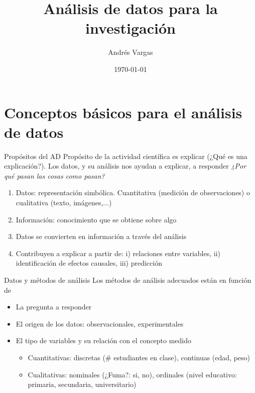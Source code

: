 \documentclass{beamer}
\title{Análisis de datos para la investigación}
\date {\today}
\author {Andrés Vargas}
\institute {Universidad del Norte \\ Departamento de Economía}
\begin{document}
	\maketitle
\section{Conceptos básicos para el análisis de datos}

\begin{frame}{Propósitos del AD}
Propósito de la actividad científica es explicar (¿Qué es una explicación?). Los datos, y su análisis nos ayudan a explicar, a responder \textit{¿Por qué pasan las cosas como pasan?}
\begin{enumerate}
    \item Datos: representación simbólica. Cuantitativa (medición de observaciones) o cualitativa (texto, imágenes,...)
    \item Información: conocimiento que se obtiene sobre algo
    \item Datos se convierten en información a través del análisis
    \item Contribuyen a explicar a partir de: i) relaciones entre variables, ii) identificación de efectos causales, iii) predicción
\end{enumerate}
    
\end{frame}

\begin{frame}{Datos y métodos de análisis}
Los métodos de análisis adecuados están en función de
\begin{itemize}
    \item La pregunta a responder
    \item El origen de los datos: observacionales, experimentales
    \item El tipo de variables y su relación con el concepto medido
    \begin{itemize}
        \item Cuantitativas: discretas (\# estudiantes en clase), continuas (edad, peso)
        \item Cualitativas: nominales (¿Fuma?: si, no), ordinales (nivel educativo: primaria, secundaria, universitario)
    \end{itemize}
\end{itemize}
    
\end{frame}
\end{document}
